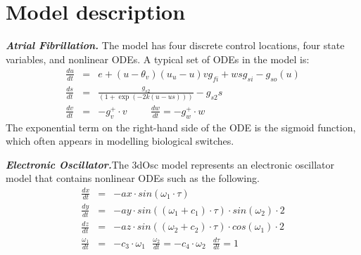 \section{Model description}\label{apndx:model}

\textbf{\textit{Atrial Fibrillation.}} The model has four discrete control locations, four state variables, and nonlinear ODEs. A typical set of ODEs in the model is:
\begin{eqnarray*}
\frac{du}{dt} &=& e + (u-\theta_v)(u_u-u ) v g_{fi} + wsg_{si}-g_{so}(u)\\
\frac{ds}{dt} &=& \displaystyle\frac{g_{s2}}{(1+\exp(-2k(u-us)))} -  g_{s2}s\\
\frac{dv}{dt} &=& -g_v^+\cdot v \hspace{1cm} \frac{dw}{dt} = -g_w^+\cdot w
\end{eqnarray*}
The exponential term on the right-hand side of the ODE is the sigmoid function, which often appears in modelling biological switches.

\textbf{\textit{Electronic Oscillator.}}The 3dOsc model represents an electronic oscillator model that contains nonlinear ODEs such as the following.
\begin{eqnarray*}
\frac{dx}{dt} &=& - ax \cdot sin(\omega_1 \cdot \tau)\\
\frac{dy}{dt} &=& - ay \cdot sin( (\omega_1 + c_1) \cdot \tau) \cdot sin(\omega_2)\cdot 2\\
\frac{dz}{dt} &=& - az \cdot sin( (\omega_2 + c_2) \cdot \tau) \cdot cos(\omega_1)\cdot 2\\
\frac{\omega_1}{dt} &=& - c_3\cdot \omega_1\ \ \ \frac{\omega_2}{dt} = -c_4\cdot\omega_2\ \ \ \frac{d\tau}{dt} = 1
\end{eqnarray*}

